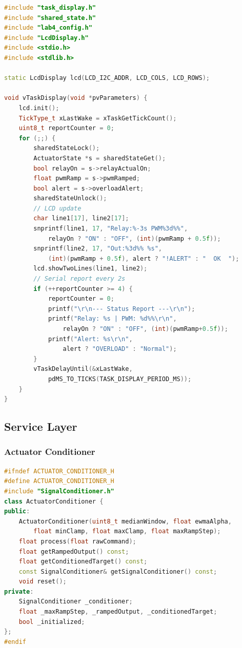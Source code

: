 \begin{lstlisting}[language=C++, caption=task\_display.cpp --- LCD and serial reporting task, label=lst:task_display_cpp]
#include "task_display.h"
#include "shared_state.h"
#include "lab4_config.h"
#include "LcdDisplay.h"
#include <stdio.h>
#include <stdlib.h>

static LcdDisplay lcd(LCD_I2C_ADDR, LCD_COLS, LCD_ROWS);

void vTaskDisplay(void *pvParameters) {
    lcd.init();
    TickType_t xLastWake = xTaskGetTickCount();
    uint8_t reportCounter = 0;
    for (;;) {
        sharedStateLock();
        ActuatorState *s = sharedStateGet();
        bool relayOn = s->relayActualOn;
        float pwmRamp = s->pwmRamped;
        bool alert = s->overloadAlert;
        sharedStateUnlock();
        // LCD update
        char line1[17], line2[17];
        snprintf(line1, 17, "Relay:%-3s PWM%3d%%",
            relayOn ? "ON" : "OFF", (int)(pwmRamp + 0.5f));
        snprintf(line2, 17, "Out:%3d%% %s",
            (int)(pwmRamp + 0.5f), alert ? "!ALERT" : "  OK  ");
        lcd.showTwoLines(line1, line2);
        // Serial report every 2s
        if (++reportCounter >= 4) {
            reportCounter = 0;
            printf("\r\n--- Status Report ---\r\n");
            printf("Relay: %s | PWM: %d%%\r\n",
                relayOn ? "ON" : "OFF", (int)(pwmRamp+0.5f));
            printf("Alert: %s\r\n",
                alert ? "OVERLOAD" : "Normal");
        }
        vTaskDelayUntil(&xLastWake,
            pdMS_TO_TICKS(TASK_DISPLAY_PERIOD_MS));
    }
}
\end{lstlisting}

\subsection{Service Layer}

\subsubsection{Actuator Conditioner}

\begin{lstlisting}[language=C++, caption=ActuatorConditioner.h --- Command conditioning interface, label=lst:act_cond_h_app]
#ifndef ACTUATOR_CONDITIONER_H
#define ACTUATOR_CONDITIONER_H
#include "SignalConditioner.h"
class ActuatorConditioner {
public:
    ActuatorConditioner(uint8_t medianWindow, float ewmaAlpha,
        float minClamp, float maxClamp, float maxRampStep);
    float process(float rawCommand);
    float getRampedOutput() const;
    float getConditionedTarget() const;
    const SignalConditioner& getSignalConditioner() const;
    void reset();
private:
    SignalConditioner _conditioner;
    float _maxRampStep, _rampedOutput, _conditionedTarget;
    bool _initialized;
};
#endif
\end{lstlisting}

